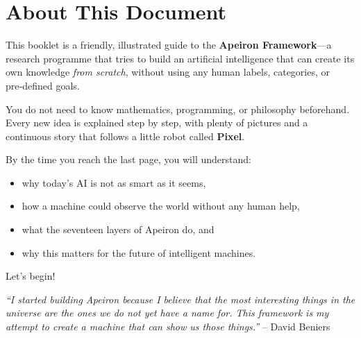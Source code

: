 \section*{About This Document}

This booklet is a friendly, illustrated guide to the \textbf{Apeiron Framework}---a
research programme that tries to build an artificial intelligence that can
create its own knowledge \emph{from scratch}, without using any human labels,
categories, or pre‑defined goals.

You do not need to know mathematics, programming, or philosophy beforehand.
Every new idea is explained step by step, with plenty of pictures and a
continuous story that follows a little robot called \textbf{Pixel}.

By the time you reach the last page, you will understand:
\begin{itemize}
    \item why today’s AI is not as smart as it seems,
    \item how a machine could observe the world without any human help,
    \item what the seventeen layers of Apeiron do, and
    \item why this matters for the future of intelligent machines.
\end{itemize}

Let’s begin!

\vspace{1em}
\textit{“I started building Apeiron because I believe that the most
interesting things in the universe are the ones we do not yet have a name
for.  This framework is my attempt to create a machine that can show us
those things.”} \hfill – David Beniers